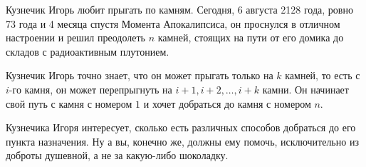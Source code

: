 Кузнечик Игорь любит прыгать по камням. Сегодня, 6 августа 2128 года, ровно 73 года и 4 месяца спустя Момента Апокалипсиса, он проснулся в отличном настроении и решил преодолеть $n$ камней, стоящих на пути от его домика до складов с радиоактивным плутонием. 

Кузнечик Игорь точно знает, что он может прыгать только на $k$ камней, то есть с $i$-го камня, он может перепрыгнуть на $i + 1, i + 2, \ldots, i + k$ камни. Он начинает свой путь с камня с номером $1$ и хочет добраться до камня с номером $n$.

Кузнечика Игоря интересует, сколько есть различных способов добраться до его пункта назначения. Ну а вы, конечно же, должны ему помочь, исключительно из доброты душевной, а не за какую-либо шоколадку.